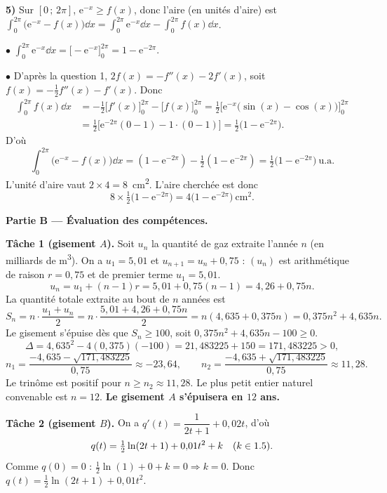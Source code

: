 \smallskip
\noindent\textbf{5)} Sur $[0\,;\,2\pi]$, $\mathrm{e}^{-x}\ge f(x)$, donc l'aire (en unités d'aire) est
$\displaystyle\int_0^{2\pi}\big(\mathrm{e}^{-x}-f(x)\big)\dd x=\int_0^{2\pi}\mathrm{e}^{-x}\dd x-\int_0^{2\pi}f(x)\dd x$.

$\bullet$ $\displaystyle\int_0^{2\pi}\mathrm{e}^{-x}\dd x=\big[-\mathrm{e}^{-x}\big]_0^{2\pi}=1-\mathrm{e}^{-2\pi}.$

$\bullet$ D'après la question 1, $2f(x)=-f''(x)-2f'(x)$, soit $f(x)=-\tfrac12 f''(x)-f'(x)$. Donc
\begin{align*}
\int_0^{2\pi}f(x)\dd x&=-\tfrac12\big[f'(x)\big]_0^{2\pi}-\big[f(x)\big]_0^{2\pi}
=\tfrac12\Big[\mathrm{e}^{-x}\big(\sin(x)-\cos(x)\big)\Big]_0^{2\pi}\\
&=\tfrac12\Big[\mathrm{e}^{-2\pi}(0-1)-1\cdot(0-1)\Big]=\tfrac12\big(1-\mathrm{e}^{-2\pi}\big).
\end{align*}
D'où
\[ \int_0^{2\pi}\big(\mathrm{e}^{-x}-f(x)\big)\dd x=(1-\mathrm{e}^{-2\pi})-\tfrac12(1-\mathrm{e}^{-2\pi})=\tfrac12\big(1-\mathrm{e}^{-2\pi}\big)\ \text{u.a.} \]
L'unité d'aire vaut $2\times4=8$~cm\textsuperscript{2}. L'aire cherchée est donc
\[ 8\times\tfrac12\big(1-\mathrm{e}^{-2\pi}\big)=\boxed{4\big(1-\mathrm{e}^{-2\pi}\big)\ \text{cm}^2.} \]

\bigskip
\noindent\textbf{Partie B — Évaluation des compétences.}

\smallskip
\noindent\textbf{Tâche 1 (gisement $A$).} Soit $u_n$ la quantité de gaz extraite l'année $n$ (en
milliards de m\textsuperscript{3}). On a $u_1=5{,}01$ et $u_{n+1}=u_n+0{,}75$ : $(u_n)$ est arithmétique de
raison $r=0{,}75$ et de premier terme $u_1=5{,}01$.
\[ u_n=u_1+(n-1)r=5{,}01+0{,}75(n-1)=4{,}26+0{,}75n. \]
La quantité totale extraite au bout de $n$ années est
\[ S_n=n\cdot\frac{u_1+u_n}{2}=n\cdot\frac{5{,}01+4{,}26+0{,}75n}{2}=n(4{,}635+0{,}375n)=0{,}375n^2+4{,}635n. \]
Le gisement s'épuise dès que $S_n\ge100$, soit $0{,}375n^2+4{,}635n-100\ge0$.
\[ \Delta=4{,}635^2-4(0{,}375)(-100)=21{,}483225+150=171{,}483225>0, \]
\[ n_1=\frac{-4{,}635-\sqrt{171{,}483225}}{0{,}75}\approx-23{,}64,\qquad
n_2=\frac{-4{,}635+\sqrt{171{,}483225}}{0{,}75}\approx11{,}28. \]
Le trinôme est positif pour $n\ge n_2\approx11{,}28$. Le plus petit entier naturel convenable est
$n=12$. \textbf{Le gisement $A$ s'épuisera en $12$ ans.}

\smallskip
\noindent\textbf{Tâche 2 (gisement $B$).} On a $q'(t)=\dfrac{1}{2t+1}+0{,}02t$, d'où
\[ q(t)=\tfrac12\ln(2t+1)+0{,}01t^2+k\quad(k\in1.5). \]
Comme $q(0)=0$ : $\tfrac12\ln(1)+0+k=0\Rightarrow k=0$. Donc $q(t)=\tfrac12\ln(2t+1)+0{,}01t^2$.

